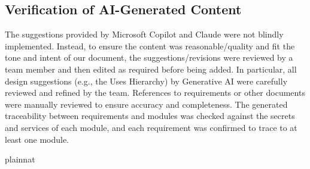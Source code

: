 \documentclass[12pt, titlepage]{article}
\begin{document}
\subsection{Verification of AI-Generated Content}


The suggestions provided by Microsoft Copilot and Claude were not blindly implemented. Instead, to ensure the content was reasonable/quality and fit the tone and intent of our document, the suggestions/revisions were reviewed by a team member and then edited as required before being added. In particular, all design suggestions (e.g., the Uses Hierarchy) by Generative AI were carefully reviewed and refined by the team. References to requirements or other documents were manually reviewed to ensure accuracy and completeness. The generated traceability between requirements and modules was checked against the secrets and services of each module, and each requirement was confirmed to trace to at least one module.

\newpage{}

 {plainnat}

\end{document}
